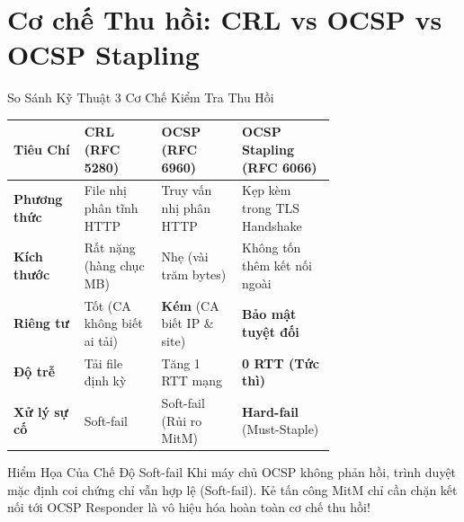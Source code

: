 \section{Cơ chế Thu hồi: CRL vs OCSP vs OCSP Stapling}

\begin{frame}{So Sánh Kỹ Thuật 3 Cơ Chế Kiểm Tra Thu Hồi}
  \begin{table}[h]
    \centering\scriptsize
    \begin{tabularx}{\linewidth}{@{}p{0.22\linewidth} p{0.24\linewidth} p{0.25\linewidth} X@{}}
      \toprule
      \textbf{Tiêu Chí} & \textbf{CRL (RFC 5280)} & \textbf{OCSP (RFC 6960)} & \textbf{OCSP Stapling (RFC 6066)} \\
      \midrule
      \textbf{Phương thức} & File nhị phân tĩnh HTTP & Truy vấn nhị phân HTTP & Kẹp kèm trong TLS Handshake \\
      \textbf{Kích thước} & Rất nặng (hàng chục MB) & Nhẹ (vài trăm bytes) & Không tốn thêm kết nối ngoài \\
      \textbf{Riêng tư} & Tốt (CA không biết ai tải) & \textbf{Kém} (CA biết IP \& site) & \textbf{Bảo mật tuyệt đối} \\
      \textbf{Độ trễ} & Tải file định kỳ & Tăng 1 RTT mạng & \textbf{0 RTT (Tức thì)} \\
      \textbf{Xử lý sự cố} & Soft-fail & Soft-fail (Rủi ro MitM) & \textbf{Hard-fail} (Must-Staple) \\
      \bottomrule
    \end{tabularx}
  \end{table}

  \begin{alertblock}{Hiểm Họa Của Chế Độ Soft-fail}
    Khi máy chủ OCSP không phản hồi, trình duyệt mặc định coi chứng chỉ vẫn hợp lệ (Soft-fail). Kẻ tấn công MitM chỉ cần chặn kết nối tới OCSP Responder là vô hiệu hóa hoàn toàn cơ chế thu hồi!
  \end{alertblock}
\end{frame}

